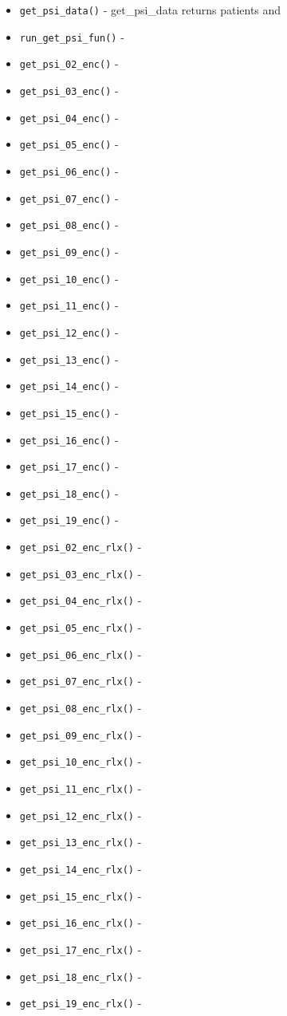 \documentclass[
]{book}
\providecommand{\tightlist}{%
  \setlength{\itemsep}{0pt}\setlength{\parskip}{0pt}}
\begin{document}
\begin{itemize}
\tightlist
\item
  \texttt{get\_psi\_data()} - get\_psi\_data returns patients and
\item
  \texttt{run\_get\_psi\_fun()} -
\item
  \texttt{get\_psi\_02\_enc()} -
\item
  \texttt{get\_psi\_03\_enc()} -
\item
  \texttt{get\_psi\_04\_enc()} -
\item
  \texttt{get\_psi\_05\_enc()} -
\item
  \texttt{get\_psi\_06\_enc()} -
\item
  \texttt{get\_psi\_07\_enc()} -
\item
  \texttt{get\_psi\_08\_enc()} -
\item
  \texttt{get\_psi\_09\_enc()} -
\item
  \texttt{get\_psi\_10\_enc()} -
\item
  \texttt{get\_psi\_11\_enc()} -
\item
  \texttt{get\_psi\_12\_enc()} -
\item
  \texttt{get\_psi\_13\_enc()} -
\item
  \texttt{get\_psi\_14\_enc()} -
\item
  \texttt{get\_psi\_15\_enc()} -
\item
  \texttt{get\_psi\_16\_enc()} -
\item
  \texttt{get\_psi\_17\_enc()} -
\item
  \texttt{get\_psi\_18\_enc()} -
\item
  \texttt{get\_psi\_19\_enc()} -
\item
  \texttt{get\_psi\_02\_enc\_rlx()} -
\item
  \texttt{get\_psi\_03\_enc\_rlx()} -
\item
  \texttt{get\_psi\_04\_enc\_rlx()} -
\item
  \texttt{get\_psi\_05\_enc\_rlx()} -
\item
  \texttt{get\_psi\_06\_enc\_rlx()} -
\item
  \texttt{get\_psi\_07\_enc\_rlx()} -
\item
  \texttt{get\_psi\_08\_enc\_rlx()} -
\item
  \texttt{get\_psi\_09\_enc\_rlx()} -
\item
  \texttt{get\_psi\_10\_enc\_rlx()} -
\item
  \texttt{get\_psi\_11\_enc\_rlx()} -
\item
  \texttt{get\_psi\_12\_enc\_rlx()} -
\item
  \texttt{get\_psi\_13\_enc\_rlx()} -
\item
  \texttt{get\_psi\_14\_enc\_rlx()} -
\item
  \texttt{get\_psi\_15\_enc\_rlx()} -
\item
  \texttt{get\_psi\_16\_enc\_rlx()} -
\item
  \texttt{get\_psi\_17\_enc\_rlx()} -
\item
  \texttt{get\_psi\_18\_enc\_rlx()} -
\item
  \texttt{get\_psi\_19\_enc\_rlx()} -
\end{itemize}
\end{document}
